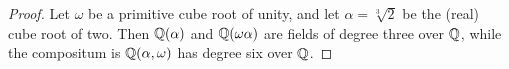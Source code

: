 \begin{proof} 
    Let $\omega$ be a primitive cube root of unity, and let $\alpha = \sqrt[3]{2}$ be the (real) cube root of two. Then $\mathbb{Q}(\alpha)$ and $\mathbb{Q}(\omega\alpha)$ are fields of degree three over $\mathbb{Q}$, while the compositum is $\mathbb{Q}(\alpha, \omega)$ has degree six over $\mathbb{Q}$.
\end{proof}
